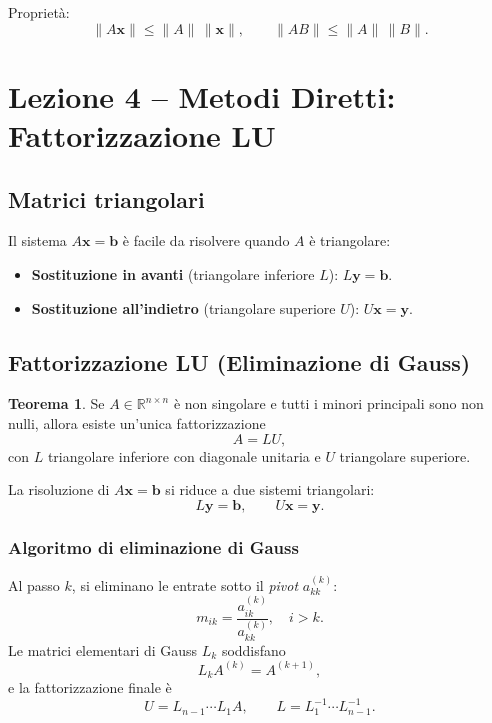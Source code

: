 \documentclass[12pt,a4paper]{article}
\theoremstyle{definition}
\newtheorem{teorema}{Teorema}[section]
\begin{document}
Proprietà:
\[
  \|A\mathbf{x}\| \leq \|A\|\,\|\mathbf{x}\|, \qquad
  \|AB\| \leq \|A\|\,\|B\|.
\]

\section{Lezione 4 -- Metodi Diretti: Fattorizzazione LU}

\subsection{Matrici triangolari}

Il sistema $A\mathbf{x} = \mathbf{b}$ è facile da risolvere quando $A$ è triangolare:
\begin{itemize}
  \item \textbf{Sostituzione in avanti} (triangolare inferiore $L$): $L\mathbf{y} = \mathbf{b}$.
  \item \textbf{Sostituzione all'indietro} (triangolare superiore $U$): $U\mathbf{x} = \mathbf{y}$.
\end{itemize}

\subsection{Fattorizzazione LU (Eliminazione di Gauss)}

\begin{teorema}
Se $A \in \mathbb{R}^{n \times n}$ è non singolare e tutti i minori principali sono non nulli, allora esiste un'unica fattorizzazione
\[
  A = LU,
\]
con $L$ triangolare inferiore con diagonale unitaria e $U$ triangolare superiore.
\end{teorema}

La risoluzione di $A\mathbf{x} = \mathbf{b}$ si riduce a due sistemi triangolari:
\[
  L\mathbf{y} = \mathbf{b}, \qquad U\mathbf{x} = \mathbf{y}.
\]

\subsubsection{Algoritmo di eliminazione di Gauss}

Al passo $k$, si eliminano le entrate sotto il \emph{pivot} $a_{kk}^{(k)}$:
\[
  m_{ik} = \frac{a_{ik}^{(k)}}{a_{kk}^{(k)}}, \quad i > k.
\]
Le matrici elementari di Gauss $L_k$ soddisfano
\[
  L_k A^{(k)} = A^{(k+1)},
\]
e la fattorizzazione finale è
\[
  U = L_{n-1} \cdots L_1 A, \qquad L = L_1^{-1} \cdots L_{n-1}^{-1}.
\]
\end{document}
